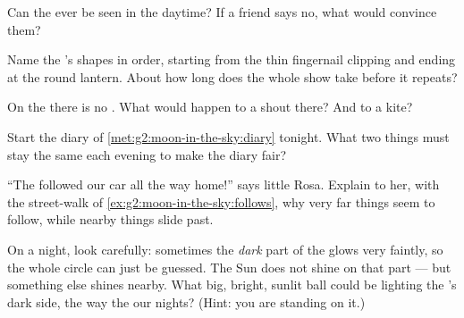 \begin{exercise}[$\star$]\label{exo:g2:moon-in-the-sky:5}
Can the  ever be seen in the daytime? If a friend says no, what
would convince them?
\end{exercise}

\begin{exercise}[$\star$]\label{exo:g2:moon-in-the-sky:6}
Name the 's shapes in order, starting from the thin fingernail
clipping and ending at the round lantern. About how long does the
whole show take before it repeats?
\end{exercise}

\begin{exercise}[$\star$]\label{exo:g2:moon-in-the-sky:7}
On the  there is no . What would happen to a shout there?
And to a kite?
\end{exercise}

\begin{exercise}[$\star$]\label{exo:g2:moon-in-the-sky:8}
Start the  diary of \cref{met:g2:moon-in-the-sky:diary} tonight.
What two things must stay the same each evening to make the diary
fair?
\end{exercise}

\begin{exercise}[$\star\star$]\label{exo:g2:moon-in-the-sky:9}
``The  followed our car all the way home!'' says little Rosa.
Explain to her, with the street-walk of
\cref{ex:g2:moon-in-the-sky:follows}, why very far things seem to
follow, while nearby things slide past.
\end{exercise}

\begin{exercise}[$\star\star$]\label{exo:g2:moon-in-the-sky:10}
On a  night, look carefully: sometimes the \emph{dark} part
of the  glows very faintly, so the whole circle can just be
guessed. The Sun does not shine on that part --- but something else
shines nearby. What big, bright, sunlit ball could be lighting the
's dark side, the way the   our nights? (Hint: you are
standing on it.)
\end{exercise}
